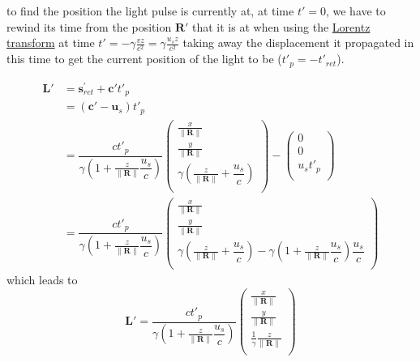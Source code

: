 to find the position the light pulse is currently at, at time $t{'}=0$, we have to rewind its time from the position $\mathbf{R}{'}$ that it is at when using the \hyperlink{def-lorentz-transform}{Lorentz transform} at time $t{'}= -{\gamma}\frac{vz}{c^2}= {\gamma}\frac{u_s z}{c^2}$ taking away the displacement it propagated in this time to get the current position of the light to be ($t{'}_{p}=- t{'}_{ret}$).

\begin{equation}
	\begin{split}
		\mathbf{L}{'}
		 & = \mathbf{s}_{ret}^{'} + \mathbf{c}{'}t{'}_{p}
		\\
		 & = \left( \mathbf{c}{'} - \mathbf{u}_s \right)t{'}_{p}
		\\
		 & = \dfrac{c t{'}_{p}}{{\gamma}\left(1 + \frac{z}{\|\mathbf{R}\|} \dfrac{u_s}{c} \right)}
		\begin{pmatrix}
			\frac{x}{\|\mathbf{R}\|}                                          \\
			\frac{y}{\|\mathbf{R}\|}                                          \\
			{\gamma} \left( \frac{z}{\|\mathbf{R}\|} + \dfrac{u_s}{c} \right) \\
		\end{pmatrix}
		-
		\begin{pmatrix}
			0          \\
			0          \\
			u_s t{'}_{p} \\
		\end{pmatrix}
		\\
		 & = \dfrac{c t{'}_{p}}{{\gamma}\left(1 + \frac{z}{\|\mathbf{R}\|} \dfrac{u_s}{c} \right)}
		\begin{pmatrix}
			\frac{x}{\|\mathbf{R}\|}                                                                                                                             \\
			\frac{y}{\|\mathbf{R}\|}                                                                                                                             \\
			{\gamma} \left( \frac{z}{\|\mathbf{R}\|} + \dfrac{u_s}{c} \right) - {\gamma}\left(1 + \frac{z}{\|\mathbf{R}\|} \dfrac{u_s}{c} \right) \dfrac{u_s}{c} \\
		\end{pmatrix}
	\end{split}
\end{equation}
which leads to
\begin{equation}
	\mathbf{L}{'} = \dfrac{c t{'}_{p}}{{\gamma}\left(1 + \frac{z}{\|\mathbf{R}\|} \dfrac{u_s}{c} \right)}
	\begin{pmatrix}
		\frac{x}{\|\mathbf{R}\|}                    \\
		\frac{y}{\|\mathbf{R}\|}                    \\
		\frac{1}{{\gamma}} \frac{z}{\|\mathbf{R}\|} \\
	\end{pmatrix}
\end{equation}

